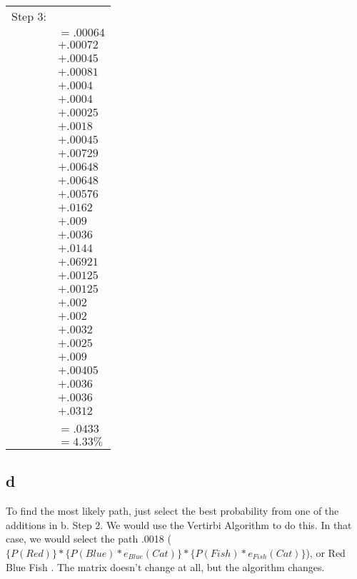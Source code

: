 \documentclass[12pt]{article}
\begin{document}
\begin{tabular}{l l}
	Step 3: 	&	\\
			&	$ = .00064 $\\	%
			&	$ +  .00072 $\\
			&	$ +  .00045$\\
			&	$ +  .00081$\\
			&	$ +  .0004$\\
			&	$ +  .0004$\\
			&	$ +  .00025$\\
			&	$ +  .0018$\\
			&	$ +  .00045$\\
			&	$ + .00729$\\		%
			&	$ + .00648$\\
			&	$ + .00648$\\
			&	$ + .00576$\\
			&	$ + .0162$\\
			&	$ + .009$\\
			&	$ + .0036$\\
			&	$ + .0144$\\
			&	$ + .06921$\\
			&	$ + .00125$\\
			&	$ + .00125$\\
			&	$ + .002$\\
			&	$ + .002$\\
			&	$ + .0032$\\
			&	$ + .0025$\\
			&	$ + .009$\\
			&	$ + .00405$\\
			&	$ + .0036$\\
			&	$ + .0036$\\
			&	$ + .0312$\\
			& \\
			& 	$ = .0433 $\\
			&	$ = 4.33\%$\\
\end{tabular}
\normalsize

\subsection*{d}
To find the most likely path, just select the best probability from one of the additions in b. Step 2. We would use the Vertirbi Algorithm to do this.
In that case, we would select the path .0018 ($ \{P(Red)\} * \{P(Blue) * e_{Blue}(Cat)\} * \{P(Fish) * e_{Fish}(Cat)\} $), or Red Blue Fish . The matrix
doesn't change at all, but the algorithm changes.
\end{document}
